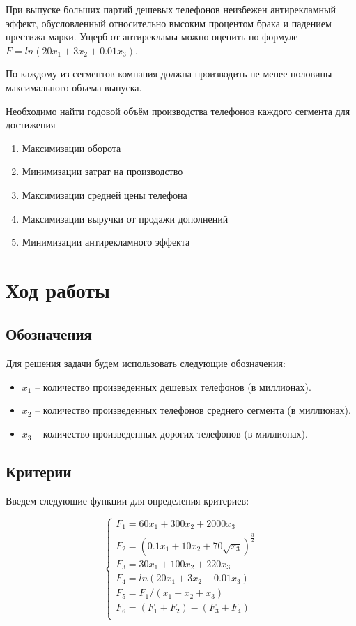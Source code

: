 \documentclass[14pt,a4paper,report]{report}
\begin{document}
При выпуске больших партий дешевых телефонов неизбежен антирекламный эффект, обусловленный относительно высоким процентом брака и падением престижа марки. Ущерб от антирекламы можно оценить по формуле $F=ln(20x_1+3x_2+0.01x_3)$.

По каждому из сегментов компания должна производить не менее половины
максимального объема выпуска.

Необходимо найти годовой объём производства телефонов каждого сегмента
для достижения

\begin{enumerate}
	\item Максимизации оборота
	\item Минимизации затрат на производство
	\item Максимизации средней цены телефона
	\item Максимизации выручки от продажи дополнений
	\item Минимизации антирекламного эффекта
\end{enumerate}

\section{Ход работы}

\subsection{Обозначения}

Для решения задачи будем использовать следующие обозначения:

\begin{itemize}
	\item $x_1$ -- количество произведенных дешевых телефонов (в миллионах).
	\item $x_2$ -- количество произведенных телефонов среднего сегмента (в миллионах).
	\item $x_3$ -- количество произведенных дорогих телефонов (в миллионах).
\end{itemize}

\subsection{Критерии}

Введем следующие функции для определения критериев:

\begin{equation*}
\begin{cases}
	\text{$F_1=60x_1+300x_2+2000x_3$} \\
	\text{$F_2=(0.1x_1+10x_2+70\sqrt{x_3})^{\frac{3}{2}}$} \\
	\text{$F_3=30x_1+100x_2+220x_3$} \\
	\text{$F_4=ln(20x_1+3x_2+0.01x_3)$} \\
	\text{$F_5=F_1/(x_1+x_2+x_3)$} \\
	\text{$F_6=(F_1+F_2)-(F_3+F_4)$} \\
\end{cases}
\end{equation*}
\end{document}
